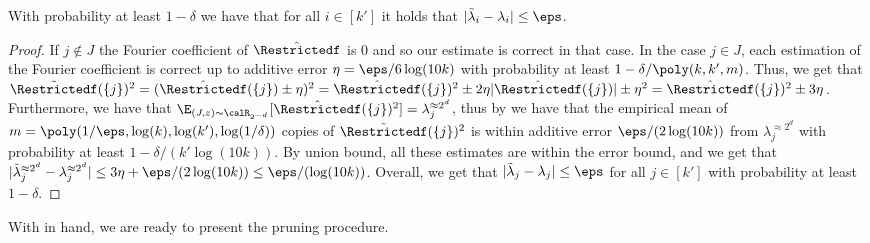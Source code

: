 \begin{lemma}
\label{lemma:lambda-i-correctness}
With probability at least $1-\delta$ we have that for all $i\in [k']$ it holds that 
$|\tilde{\lambda}_i -\lambda_i|\le \eps$.
\end{lemma}
\begin{proof}
If $j \notin J$ the Fourier coefficient of $\hat{\Restrictedf}$ is $0$ and so our estimate is correct in that case. In the case $j \in J$, each estimation of the Fourier coefficient is correct up to additive error $\eta = \eps/6 \log(10k)$ with probability at least $1-\delta/\poly(k,k',m)$.
Thus, we get that $\tilde{\Restrictedf}(\{j\})^2 = (\hat{\Restrictedf}(\{j\}) \pm \eta)^2 = \hat{\Restrictedf}(\{j\})^2  \pm 2\eta|\hat{\Restrictedf}(\{j\})| \pm \eta^2 = \hat{\Restrictedf}(\{j\})^2 \pm 3\eta$.
Furthermore, we have that $\E_{(J,z)\sim \calR_{2^{-d}}}[\hat{\Restrictedf}(\{j\})^2] = \lambda_j^{\approx 2^d}$, thus by  we have that the empirical mean of $m = \poly(1/\eps,\log(k), \log(k'), \log(1/\delta))$ copies of  $\tilde{\Restrictedf}(\{j\})^2$ is within additive error $\eps/(2 \log(10k))$ from $\lambda_j^{\approx 2^d}$ with probability at least  $1-\delta/(k' \log(10k))$. By union bound, all these estimates are within the error bound, and we get that $|\tilde{\lambda}_j^{\approx 2^d} - \lambda_j^{\approx 2^d}| \le 3\eta + \eps/(2 \log(10k)) \le \eps/(\log(10k))$. Overall, we get that $|\tilde{\lambda}_j - \lambda_j| \le \eps$ for all $j \in[k']$ with probability at least $1-\delta$.
\end{proof}



With  in hand, we are ready to present the pruning procedure.

